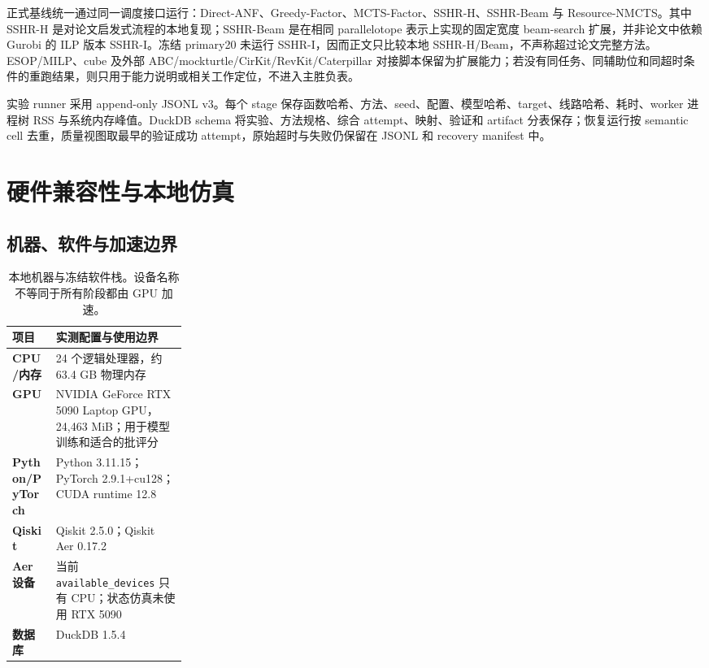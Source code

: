\documentclass[UTF8,a4paper,12pt]{ctexart}
\newcommand{\method}{Resource-NMCTS}
\begin{document}
正式基线统一通过同一调度接口运行：Direct-ANF、Greedy-Factor、MCTS-Factor、SSHR-H、SSHR-Beam 与 \method{}。其中 SSHR-H 是对论文启发式流程的本地复现；SSHR-Beam 是在相同 parallelotope 表示上实现的固定宽度 beam-search 扩展，并非论文中依赖 Gurobi 的 ILP 版本 SSHR-I。冻结 primary20 未运行 SSHR-I，因而正文只比较本地 SSHR-H/Beam，不声称超过论文完整方法。ESOP/MILP、cube 及外部 ABC/mockturtle/CirKit/RevKit/Caterpillar 对接脚本保留为扩展能力；若没有同任务、同辅助位和同超时条件的重跑结果，则只用于能力说明或相关工作定位，不进入主胜负表。

实验 runner 采用 append-only JSONL v3。每个 stage 保存函数哈希、方法、seed、配置、模型哈希、target、线路哈希、耗时、worker 进程树 RSS 与系统内存峰值。DuckDB schema 将实验、方法规格、综合 attempt、映射、验证和 artifact 分表保存；恢复运行按 semantic cell 去重，质量视图取最早的验证成功 attempt，原始超时与失败仍保留在 JSONL 和 recovery manifest 中。

\section{硬件兼容性与本地仿真}
\label{sec:hw}

\subsection{机器、软件与加速边界}

\begin{table}[H]
  \centering
  \footnotesize
  \caption{本地机器与冻结软件栈。设备名称不等同于所有阶段都由 GPU 加速。}
  \label{tab:environment}
  \begin{tabularx}{\linewidth}{>{\bfseries}p{0.25\linewidth}Y}
    \toprule
    项目 & 实测配置与使用边界 \\
    \midrule
    CPU/内存 & 24 个逻辑处理器，约 63.4 GB 物理内存 \\
    GPU & NVIDIA GeForce RTX 5090 Laptop GPU，24,463 MiB；用于模型训练和适合的批评分 \\
    Python/PyTorch & Python 3.11.15；PyTorch 2.9.1+cu128；CUDA runtime 12.8 \\
    Qiskit & Qiskit 2.5.0；Qiskit Aer 0.17.2 \\
    Aer 设备 & 当前 \texttt{available\_devices} 只有 CPU；状态仿真未使用 RTX 5090 \\
    数据库 & DuckDB 1.5.4 \\
    \bottomrule
  \end{tabularx}
\end{table}
\end{document}
